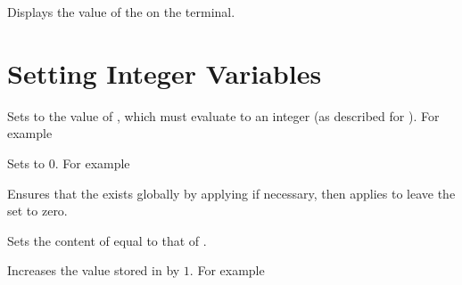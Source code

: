 \documentclass[oneside]{book}
\begin{document}
\begin{function}{\IntVarShow}
\begin{syntax}
 
\end{syntax}
Displays the value of the  on the terminal.
\end{function}

\section{Setting Integer Variables}

\begin{function}{\IntSet}
\begin{syntax}
  
\end{syntax}
Sets  to the value of ,
which must evaluate to an integer (as described for ).
For example
\begin{demohigh}
\IntSet {}
\IntUse \lTmpaInt
\end{demohigh}
\end{function}

\begin{function}{\IntZero}
\begin{syntax}
 
\end{syntax}
Sets  to $0$. For example
\begin{demohigh}
\IntSet {}
\IntZero \lTmpaInt
\IntUse \lTmpaInt
\end{demohigh}
\end{function}

\begin{function}{\IntZeroNew}
\begin{syntax}
 
\end{syntax}
Ensures that the  exists globally by applying
 if necessary, then applies  to leave
the  set to zero.
\end{function}

\begin{function}{\IntSetEq}
\begin{syntax}
  
\end{syntax}
Sets the content of  equal to that of
.
\end{function}

\begin{function}{\IntIncr}
\begin{syntax}
 
\end{syntax}
Increases the value stored in  by $1$.
For example
\begin{demohigh}
\IntSet {}
\IntIncr \lTmpaInt
\IntUse \lTmpaInt
\end{demohigh}
\end{function}
\end{document}

